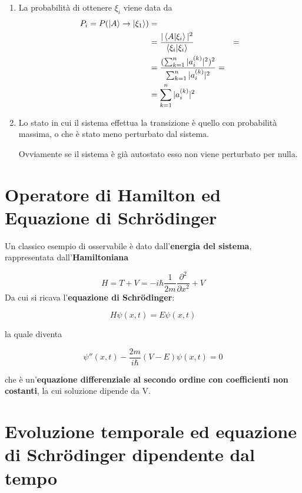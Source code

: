 \begin{enumerate}
	\item La probabilità di ottenere $\xi_i$ viene data da
	\begin{align}
	P_i=P(\ket{A} \rightarrow \ket{\xi_1}){}&= \nonumber \\ &=\frac{|\braket{A|\xi_i}|^2}{\braket{\xi_i|\xi_i}} &= \nonumber \\
	&=\frac{(\sum_{k=1}^n |a_i^{(k)}|^2)^2}{\sum_{k=1}^n |a_i^{(k)}|^2}= \nonumber \\ &=\sum_{k=1}^n |a_i^{(k)}|^2
	\end{align}
	\item Lo stato in cui il sistema effettua la transizione è quello con probabilità massima, o che è stato meno perturbato dal sistema.
	
	Ovviamente se il sistema è già autostato esso non viene perturbato per nulla.
\end{enumerate}

\section{Operatore di Hamilton ed Equazione di Schrödinger}
 
Un classico esempio di osservabile è dato dall'\textbf{energia del sistema}, rappresentata dall'\textbf{Hamiltoniana}

\begin{equation}
H= T + V = -i\hbar \frac{1}{2m} \frac{\partial^2}{\partial x^2} + V
\end{equation}
\newline
Da cui si ricava l'\textbf{equazione di Schrödinger}:

\begin{equation}
H\psi(x,t) = E\psi(x,t) 
\end{equation}

la quale diventa

\begin{equation}
\psi''(x,t) -\frac{2m}{i\hbar} (V-E)\psi(x,t)=0
\end{equation}

che è un'\textbf{equazione differenziale al secondo ordine con coefficienti non costanti}, la cui soluzione dipende da V. \newline


\section{Evoluzione temporale ed equazione di Schrödinger dipendente dal tempo}

